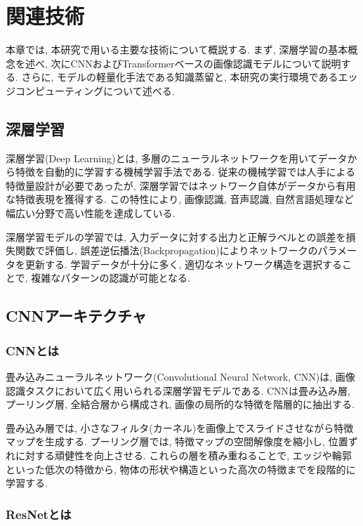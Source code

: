 \chapter{関連技術}

本章では, 本研究で用いる主要な技術について概説する. 
まず, 深層学習の基本概念を述べ, 次にCNNおよびTransformerベースの画像認識モデルについて説明する. 
さらに, モデルの軽量化手法である知識蒸留と, 本研究の実行環境であるエッジコンピューティングについて述べる.

\section{深層学習}

深層学習(Deep Learning)とは, 多層のニューラルネットワークを用いてデータから特徴を自動的に学習する機械学習手法である. 
従来の機械学習では人手による特徴量設計が必要であったが, 深層学習ではネットワーク自体がデータから有用な特徴表現を獲得する. 
この特性により, 画像認識, 音声認識, 自然言語処理など幅広い分野で高い性能を達成している.

深層学習モデルの学習では, 入力データに対する出力と正解ラベルとの誤差を損失関数で評価し, 誤差逆伝播法(Backpropagation)によりネットワークのパラメータを更新する. 
学習データが十分に多く, 適切なネットワーク構造を選択することで, 複雑なパターンの認識が可能となる.

\section{CNNアーキテクチャ}

\subsection{CNNとは}

畳み込みニューラルネットワーク(Convolutional Neural Network, CNN)は, 画像認識タスクにおいて広く用いられる深層学習モデルである. 
CNNは畳み込み層, プーリング層, 全結合層から構成され, 画像の局所的な特徴を階層的に抽出する.

畳み込み層では, 小さなフィルタ(カーネル)を画像上でスライドさせながら特徴マップを生成する. 
プーリング層では, 特徴マップの空間解像度を縮小し, 位置ずれに対する頑健性を向上させる. 
これらの層を積み重ねることで, エッジや輪郭といった低次の特徴から, 物体の形状や構造といった高次の特徴までを段階的に学習する.

\subsection{ResNetとは}

